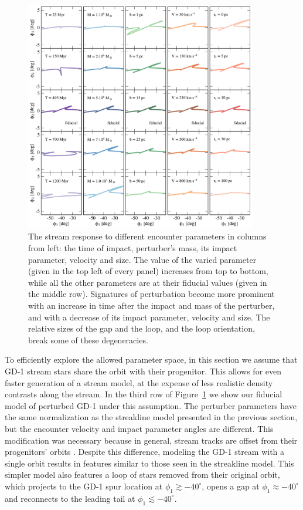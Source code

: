 \documentclass[twocolumn]{aastex62}
\begin{document}
\begin{figure}
\begin{center}
\includegraphics[width=0.9\textwidth]{excursions.pdf}
\end{center}
\caption{The stream response to different encounter parameters in columns from left: the time of impact, perturber's mass, its impact parameter, velocity and size.
The value of the varied parameter (given in the top left of every panel) increases from top to bottom, while all the other parameters are at their fiducial values (given in the middle row).
Signatures of perturbation become more prominent with an increase in time after the impact and mass of the perturber, and with a decrease of its impact parameter, velocity and size.
The relative sizes of the gap and the loop, and the loop orientation, break some of these degeneracies.
}
\label{fig:scalings}
\end{figure}

To efficiently explore the allowed parameter space, in this section we assume that GD-1 stream stars share the orbit with their progenitor.
This allows for even faster generation of a stream model, at the expense of less realistic density contrasts along the stream.
In the third row of Figure~\ref{fig:scalings} we show our fiducial model of perturbed GD-1 under this assumption.
The perturber parameters have the same normalization as the streakline model presented in the previous section, but the encounter velocity and impact parameter angles are different.
This modification was necessary because in general, stream tracks are offset from their progenitors' orbits \citep{sb2013}. 
Despite this difference, modeling the GD-1 stream with a single orbit results in features similar to those seen in the streakline model.
This simpler model also features a loop of stars removed from their original orbit, which projects to the GD-1 spur location at $\phi_1\gtrsim-40^\circ$, opens a gap at $\phi_1\approx-40^\circ$ and reconnects to the leading tail at $\phi_1\lesssim-40^\circ$.
\end{document}
